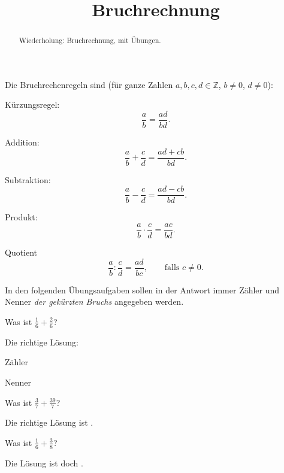 \documentclass{ximera}
\title{Bruchrechnung}
\begin{document}
\begin{abstract}
Wiederholung: Bruchrechnung, mit Übungen.
\end{abstract}
\maketitle

Die Bruchrechenregeln sind (für ganze Zahlen $a,b,c,d\in\mathbb Z$, $b\ne 0$, $d\ne 0$):

Kürzungsregel:
\[
\frac{a}{b} = \frac{ad}{bd}.
\]

Addition:
\[
\frac{a}{b} + \frac{c}{d} = \frac{ad  +cb}{bd}.
\]

Subtraktion:
\[
\frac{a}{b} - \frac{c}{d} = \frac{ad  -cb}{bd}.
\]

Produkt:
\[
\frac{a}{b} \cdot \frac{c}{d} = \frac{ac}{bd}.
\]

Quotient
\[
\frac{a}{b} : \frac{c}{d} = \frac{ad}{bc},\qquad \text{falls } c\ne 0.
\]


In den folgenden Übungsaufgaben sollen in der Antwort immer Zähler und Nenner \emph{der gekürzten Bruchs} angegeben werden.


\begin{question}
Was ist $\frac{1}{6} + \frac{2}{6}$?
\begin{solution}
Die richtige Lösung:

Zähler 

Nenner 
\end{solution}
\end{question}


\begin{question}
Was ist $\frac 37 + \frac{39}{7}$?
\begin{solution}
Die richtige Lösung ist
.
\end{solution}
\end{question}

\begin{question}
Was ist $\frac{1}{6} + \frac{3}{8}$?
\begin{solution}
Die Lösung ist doch
.
\end{solution}
\end{question}
\end{document}
